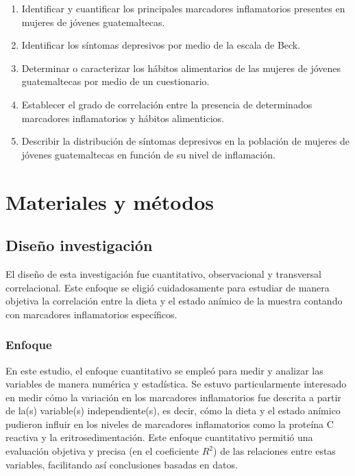 \documentclass[stu, 12pt]{apa7}
\begin{document}
	\begin{enumerate}
		\item Identificar y cuantificar los principales marcadores inflamatorios presentes en mujeres de jóvenes guatemaltecas.
		\item Identificar los síntomas depresivos por medio de la escala de Beck.
		\item Determinar o caracterizar los hábitos alimentarios de las mujeres de jóvenes guatemaltecas por medio de un cuestionario.
		\item Establecer el grado de correlación entre la presencia de determinados marcadores inflamatorios y hábitos alimenticios.
		\item Describir la distribución de síntomas depresivos en la población de mujeres de jóvenes guatemaltecas en función de su nivel de inflamación.
	\end{enumerate}


	\section{Materiales y métodos}\label{materiales-y-muxe9todos}

	\subsection{Diseño investigación}\label{diseuxf1o-investigaciuxf3n}

	El diseño de esta investigación fue cuantitativo, observacional y
	transversal correlacional. Este enfoque se eligió cuidadosamente para
	estudiar de manera objetiva la correlación entre la dieta y el estado
	anímico de la muestra contando con marcadores inflamatorios
	específicos.\\

	\subsubsection{Enfoque} En este estudio, el enfoque cuantitativo se empleó para
	medir y analizar las variables de manera numérica y estadística. Se
	estuvo particularmente interesado en medir cómo la variación en los
	marcadores inflamatorios fue descrita a partir de la(s) variable(s)
	independiente(s), es decir, cómo la dieta y el estado anímico pudieron
	influir en los niveles de marcadores inflamatorios como la proteína C
	reactiva y la eritrosedimentación. Este enfoque cuantitativo permitió una
	evaluación objetiva y precisa (en el coeficiente
	\emph{$R^2$}) de las relaciones entre estas variables, facilitando así
	conclusiones basadas en datos.\\
\end{document}
